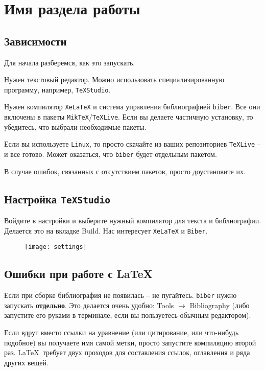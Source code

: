 
\section{Имя раздела работы}

\subsection{Зависимости}
Для начала разберемся, как это запускать. 

Нужен текстовый редактор. Можно использовать специализированную программу, например, \texttt{TeXStudio}. 

Нужен компилятор \texttt{XeLaTeX} и система управления библиографией \texttt{biber}. Все они включены в пакеты \texttt{MikTeX}/\texttt{TeXLive}. Если вы делаете частичную установку, то убедитесь, что выбрали необходимые пакеты. 

Если вы используете \texttt{Linux}, то просто скачайте из ваших репозиториев \texttt{TeXLive} -- и все готово. Может оказаться, что \texttt{biber} будет отдельным пакетом. 

В случае ошибок, связанных с отсутствием пакетов, просто доустановите их.

\subsection{Настройка \texttt{TeXStudio}}

Войдите в настройки и выберите нужный компилятор для текста и библиографии. Делается это на вкладке Build. Нас интересует \texttt{XeLaTeX} и \texttt{Biber}.
\begin{figure}[H]
    \centering
    \texttt{[image: settings]}
\end{figure}


\subsection{Ошибки при работе с \LaTeX}
Если при сборке библиография не появилась -- не пугайтесь. \texttt{biber} нужно запускать \textbf{отдельно}. Это делается очень удобно: Tools $\rightarrow$ Bibliography (либо запустите его руками в терминале, если вы пользуетесь обычным редактором).

Если вдруг вместо ссылки на уравнение (или цитирование, или что-нибудь подобное) вы получаете имя самой метки, просто запустите компиляцию второй раз. \LaTeX\, требует двух проходов для составления ссылок, оглавления и ряда других вещей. 

